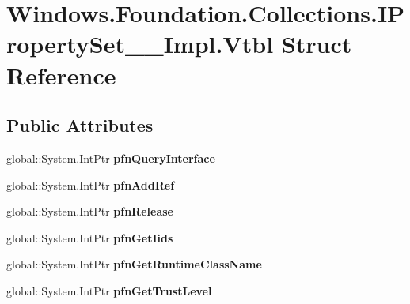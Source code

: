 \hypertarget{struct_windows_1_1_foundation_1_1_collections_1_1_i_property_set_____impl_1_1_vtbl}{}\section{Windows.\+Foundation.\+Collections.\+I\+Property\+Set\+\_\+\+\_\+\+Impl.\+Vtbl Struct Reference}
\label{struct_windows_1_1_foundation_1_1_collections_1_1_i_property_set_____impl_1_1_vtbl}
\subsection*{Public Attributes}
\begin{DoxyCompactItemize}
\item 
\mbox{\label{struct_windows_1_1_foundation_1_1_collections_1_1_i_property_set_____impl_1_1_vtbl_a28d5d552ae81635ba09f48c085fbf5f2}} 
global\+::\+System.\+Int\+Ptr {\bfseries pfn\+Query\+Interface}
\item 
\mbox{\label{struct_windows_1_1_foundation_1_1_collections_1_1_i_property_set_____impl_1_1_vtbl_a0fd5c2e0e0833b4116795726cc30ec08}} 
global\+::\+System.\+Int\+Ptr {\bfseries pfn\+Add\+Ref}
\item 
\mbox{\label{struct_windows_1_1_foundation_1_1_collections_1_1_i_property_set_____impl_1_1_vtbl_af0caa9f9c9a676aa045cbd17f044e3a3}} 
global\+::\+System.\+Int\+Ptr {\bfseries pfn\+Release}
\item 
\mbox{\label{struct_windows_1_1_foundation_1_1_collections_1_1_i_property_set_____impl_1_1_vtbl_a8b41dde3f94a66375f51ba41930a8b1f}} 
global\+::\+System.\+Int\+Ptr {\bfseries pfn\+Get\+Iids}
\item 
\mbox{\label{struct_windows_1_1_foundation_1_1_collections_1_1_i_property_set_____impl_1_1_vtbl_ad15ccdd3e9c1a36804a620a29069e06a}} 
global\+::\+System.\+Int\+Ptr {\bfseries pfn\+Get\+Runtime\+Class\+Name}
\item 
\mbox{\label{struct_windows_1_1_foundation_1_1_collections_1_1_i_property_set_____impl_1_1_vtbl_a0190f2788759aa787f27779e89482457}} 
global\+::\+System.\+Int\+Ptr {\bfseries pfn\+Get\+Trust\+Level}
\end{DoxyCompactItemize}
